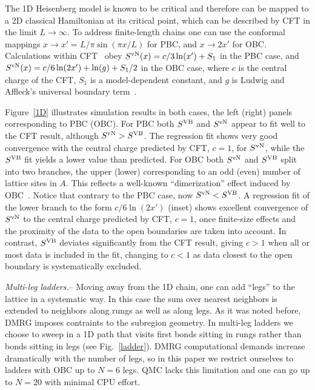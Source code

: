 \documentclass[prl,aps,twocolumn,floatfix,amsmath,amssymb,superscriptaddress,tightenlines]{revtex4}
\begin{document}
The 1D Heisenberg model is known to be critical and therefore can be
mapped to a 2D classical Hamiltonian at its critical point, which
can be described by CFT in the limit $L\to\infty$.  To address
finite-length chains one can use the conformal mappings $x\to x'=L/\pi
\sin(\pi x / L)$ for PBC, and 
$x\to 2x'$ for OBC. %
Calculations within CFT~\cite{Cardy} obey $S^{\rm vN}(x)= c/3
\ln(x') + S_1$ in the PBC case, and $S^{\rm vN}(x)= c/6 \ln(2x') +
\ln(g)+S_1/2$ in the OBC case, where $c$ is the central charge of the CFT,
$S_1$ is a model-dependent constant, and $g$ is Ludwig and Affleck's
universal boundary term~\cite{AffleckAndLudwig}.

Figure~\ref{1D} illustrates simulation results in both cases, the left
(right) panels corresponding to PBC (OBC). 
For PBC both
$S^{\rm VB}$ and $S^{ \rm vN}$ appear to fit well to the CFT result, although
$S^{ \rm vN} > S^{\rm VB}$. The regression fit shows very good
convergence with the central charge predicted by CFT, $c=1$, for $S^{ \rm vN}$, while
the $S^{\rm VB}$ fit yields a lower value than predicted.
For OBC both $S^{ \rm vN}$ and $S^{\rm VB}$ split into two branches, the upper (lower)
corresponding to an odd (even) number of lattice sites in $A$.  This
reflects a well-known ``dimerization'' effect induced by OBC~\cite{Ian1}.
Notice that contrary to the PBC case, now $S^{ \rm vN} < S^{\rm VB}$. 
A regression fit of the lower branch to the form $c/6 \ln
({2x'})$ (inset) shows excellent convergence of $S^{ \rm vN}$ to the central
charge predicted by CFT, $c=1$, once finite-size effects and the proximity
of the data to the open boundaries are taken into account.  In contrast,
 $S^{\rm VB}$ deviates significantly from the CFT result, giving 
$c>1$ when all or most data is included in the fit, changing to $c<1$
as data closest to the open boundary is systematically excluded.

{\it Multi-leg ladders.}-- Moving away from the 1D chain, one can add
``legs'' to the lattice in a systematic way. In this case the sum over
nearest neighbors is extended to neighbors along rungs as well as along
legs.  As it was noted before, DMRG imposes contraints to the subregion
geometry. In multi-leg ladders we choose to sweep in a 1D path that visits
first bonds sitting in rungs rather than bonds sitting in legs (see
Fig.~\ref{ladder}).  DMRG computational demands increase dramatically with
the number of legs, so in this paper we restrict ourselves to ladders with
OBC up to $N=6$ legs. QMC lacks this limitation and one can go up to
$N=20$ with minimal CPU effort.
\end{document}
